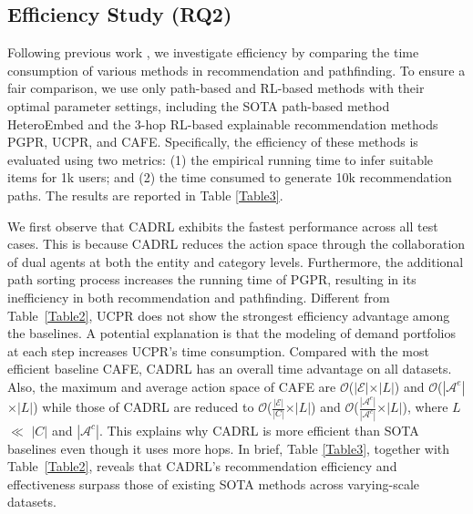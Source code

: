 \documentclass[conference]{IEEEtran}
\begin{document}
 

\subsection{Efficiency Study (RQ2)}
Following previous work \cite{CAFE}, we investigate  efficiency by comparing the time consumption of various methods in recommendation and pathfinding. To ensure a fair comparison, we use only path-based and RL-based methods with their optimal parameter settings, including the SOTA path-based method HeteroEmbed and the 3-hop RL-based explainable recommendation methods PGPR, UCPR, and CAFE. Specifically, the efficiency of these methods is evaluated using two metrics: (1) the empirical running time to infer suitable items for 1k users; and (2) the time consumed to generate 10k recommendation paths.  The results are reported in Table \ref{Table3}.

We first observe that CADRL exhibits the fastest performance across all test cases. This is because CADRL reduces the action space through the collaboration of dual agents at both the entity and category levels.  Furthermore, the additional path sorting process increases the running time of PGPR, resulting in its inefficiency in both recommendation and pathfinding. Different from Table~\ref{Table2}, UCPR does not show the strongest efficiency advantage among the baselines. A potential explanation is that  the modeling of demand portfolios at each step increases UCPR's time consumption. Compared with the most efficient baseline CAFE, CADRL has an overall time advantage on all datasets.  Also, the maximum and average action space of CAFE are $\mathcal{O}$($\left| \mathcal{E} \right|$$\times$$\left|L\right|$) and $\mathcal{O}$($\left| \mathcal{A}^e \right|$$\times$$\left|L\right|$) while those of CADRL are reduced to $\mathcal{O}$($\frac{\left| \mathcal{E} \right|}{\left| C \right|}$$\times$$\left|L\right|$) and $\mathcal{O}$($\frac{\left|\mathcal{A}^e\right|}{\left|\mathcal{A}^c\right|}$$\times$$\left|L\right|$), where $L$ $\ll$ $\left| C \right|$ and $\left|\mathcal{A}^c\right|$. This explains why CADRL is more efficient than SOTA baselines even though it uses more hops. In brief, Table \ref{Table3}, together with Table~\ref{Table2}, reveals that CADRL’s recommendation efficiency and effectiveness surpass those of existing SOTA methods across varying-scale datasets.


\end{document}
